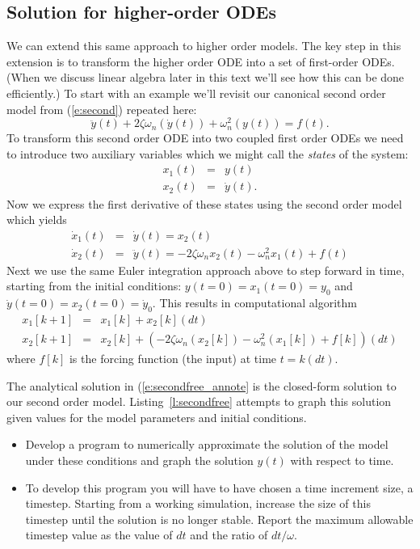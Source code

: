 \subsection{Solution for higher-order ODEs}
We can extend this same approach to higher order models.  The key step in this extension is to transform the higher order ODE into a set of first-order ODEs.  (When we discuss linear algebra later in this text we'll see how this can be done efficiently.)  To start with an example we'll revisit our canonical second order model from (\ref{e:second}) repeated here:
\begin{equation} 
\ddot{y}(t) + 2 \zeta \omega_n (\dot{y}(t)) + \omega_n^2 (y(t)) = f(t).
\end{equation} 
To transform this second order ODE into two coupled first order ODEs we need to introduce two auxiliary variables which we might call the \emph{states} of the system:
\begin{eqnarray}
x_1(t) & = & y(t) \\
x_2(t) & = & \dot{y}(t).
\end{eqnarray}
Now we express the first derivative of these states using the second order model which yields
\begin{eqnarray}
\dot{x}_1(t) & = & \dot{y}(t) = x_2(t) \\
\dot{x}_2(t) & = & \ddot{y}(t) = -2 \zeta \omega_n x_2(t) - \omega_n^2 x_1(t) + f(t) 
\end{eqnarray}
Next we use the same Euler integration approach above to step forward in time, starting from the initial conditions: $y(t=0)=x_1(t=0)=y_0$ and $\dot{y}(t=0)=x_2(t=0)=\dot{y}_0$.  This results in computational algorithm
\begin{eqnarray}
x_1[k+1] & = & x_1[k] + x_2[k](dt) \\
x_2[k+1] & = & x_2[k] + \left(-2 \zeta \omega_n (x_2[k]) - \omega_n^2 (x_1[k]) + f[k]\right) (dt) 
\end{eqnarray}
where $f[k]$ is the forcing function (the input) at time $t=k(dt)$.

\begin{ex}
The analytical solution in (\ref{e:secondfree_annote} is the closed-form solution to our second order model.  Listing~\ref{l:secondfree} attempts to graph this solution given values for the model parameters and initial conditions.
\begin{itemize}
\item Develop a program to numerically approximate the solution of the model under these conditions and graph the solution $y(t)$ with respect to time.
\item To develop this program you will have to have chosen a time increment size, a timestep.  Starting from a working simulation, increase the size of this timestep until the solution is no longer stable.  Report the maximum allowable timestep value as the value of $dt$ and the ratio of $dt/\omega$.
\end{itemize}
\end{ex}







